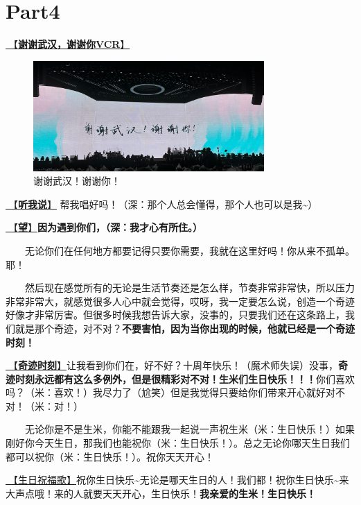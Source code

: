 \documentclass[]{ctexbook}
\begin{document}
\section{Part4}\label{wuhan-20240727-part4}

\hyperref[thank-you-vcr]{🎥【\textbf{谢谢武汉，谢谢你VCR}】}

\begin{figure}

{\centering \includegraphics[width=250pt]{img/wuhan20240727/thank-wuhan} 

}

\caption{谢谢武汉！谢谢你！}\label{fig:unnamed-chunk-59}
\end{figure}

\hyperref[listen-to-me]{🎵【\textbf{听我说}】} 帮我唱好吗！（深：那个人总会懂得，那个人也可以是我\textasciitilde）

\hyperref[hope]{🎵【\textbf{望}】}\textbf{因为遇到你们，（深：我才心有所住。）}

  无论你们在任何地方都要记得只要你需要，我就在这里好吗！你从来不孤单。耶！

  然后现在感觉所有的无论是生活节奏还是怎么样，节奏非常非常快，所以压力非常非常大，就感觉很多人心中就会觉得，哎呀，我一定要怎么说，创造一个奇迹好像才非常厉害。但很多时候我想告诉大家，没事的，只要我们还在这条路上，我们就是那个奇迹，对不对？\textbf{不要害怕，因为当你出现的时候，他就已经是一个奇迹时刻！}

\hyperref[magic-moment]{🎵【\textbf{奇迹时刻}】}让我看到你们在，好不好？十周年快乐！（魔术师失误）没事，\textbf{奇迹时刻永远都有这么多例外，但是很精彩对不对！生米们生日快乐！！！}你们喜欢吗？（米：喜欢！）我尽力了（尬笑）但是我觉得只要给你们带来开心就好对不对！（米：对！）

  无论你是不是生米，你能不能跟我一起说一声祝生米（米：生日快乐！）如果刚好你今天生日，那我们也能祝你（米：生日快乐！）。总之无论你哪天生日我们都可以祝你（米：生日快乐！）。祝你天天开心！

\hyperref[happy-birthday]{🎵【生日祝福歌】}祝你生日快乐\textasciitilde 无论是哪天生日的人！我们都！祝你生日快乐\textasciitilde 来大声点哦！来的人就要天天开心，生日快乐！\textbf{我亲爱的生米！生日快乐！}
\end{document}
